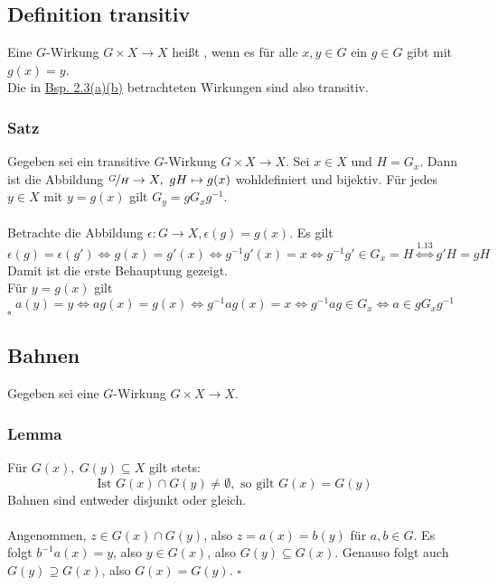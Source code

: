 \subsection{Definition transitiv}
\label{sub:def_transitiv}
Eine $G$-Wirkung $G\times X\to X$ heißt , wenn es für alle $x,y\in G$ ein $g\in G$ gibt mit $g(x)=y$.\\
Die in \hyperref[sub:bsp_wirkungen]{Bsp. 2.3(a)(b)} betrachteten Wirkungen sind also transitiv.

\subsubsection*{Satz}
Gegeben sei ein transitive $G$-Wirkung $G\times X\to X$. Sei $x\in X$ und $H=G_x$. 
Dann ist die Abbildung $\nicefrac{G}{H}\to X,~gH\mapsto g(x)$ wohldefiniert und bijektiv. 
Für jedes $y\in X$ mit $y=g(x)$ gilt $G_y=gG_xg^{-1}$.\\

\\
Betrachte die Abbildung $\epsilon:G\to X,\epsilon(g)=g(x)$. 
Es gilt 
\[
\epsilon(g)=\epsilon(g') \Leftrightarrow g(x)=g'(x) \Leftrightarrow g^{-1}g'(x)=x \Leftrightarrow g^{-1}g'\in G_x=H \stackrel{\hyperref[sub:nebenklassen]{1.13}}{\Leftrightarrow} g'H=gH
\]
Damit ist die erste Behauptung gezeigt.\\
Für $y=g(x)$ gilt 
\[
a(y)=y \Leftrightarrow ag(x)=g(x) \Leftrightarrow g^{-1}ag(x)=x \Leftrightarrow g^{-1}ag\in G_x \Leftrightarrow a\in gG_xg^{-1}
\]
\hfill $\square$

\subsection{Bahnen}
\label{sub:bahnen}
Gegeben sei eine $G$-Wirkung $G\times X\to X$.

\subsubsection*{Lemma}
Für  $G(x),~G(y)\subseteq X$ gilt stets:
\[
\text{Ist } G(x)\cap G(y)\not=\emptyset, \text{ so gilt } G(x)=G(y)
\]
Bahnen sind entweder disjunkt oder gleich.\\

\\
Angenommen, $z\in G(x)\cap G(y)$, also $z=a(x)=b(y)$ für $a,b\in G$.
Es folgt $b^{-1}a(x)=y$, also $y\in G(x)$, also $G(y)\subseteq G(x)$.
Genauso folgt auch $G(y)\supseteq G(x)$, also $G(x)=G(y)$.
\hfill $\square$

